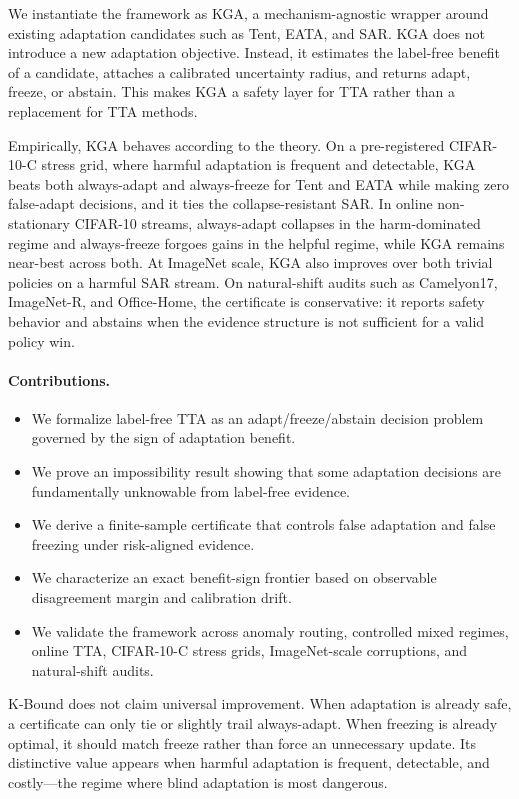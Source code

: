 \documentclass[11pt]{article}
\theoremstyle{plain}
\theoremstyle{definition}
\begin{document}
We instantiate the framework as \textsc{KGA}, a mechanism-agnostic wrapper around
existing adaptation candidates such as Tent, EATA, and SAR. \textsc{KGA} does not
introduce a new adaptation objective. Instead, it estimates the label-free benefit
of a candidate, attaches a calibrated uncertainty radius, and returns adapt,
freeze, or abstain. This makes \textsc{KGA} a safety layer for TTA rather than a
replacement for TTA methods.

Empirically, \textsc{KGA} behaves according to the theory. On a pre-registered
CIFAR-10-C stress grid, where harmful adaptation is frequent and detectable,
\textsc{KGA} beats both always-adapt and always-freeze for Tent and EATA while
making zero false-adapt decisions, and it ties the collapse-resistant SAR. In
online non-stationary CIFAR-10 streams, always-adapt collapses in the harm-dominated
regime and always-freeze forgoes gains in the helpful regime, while \textsc{KGA}
remains near-best across both. At ImageNet scale, \textsc{KGA} also improves over
both trivial policies on a harmful SAR stream. On natural-shift audits such as
Camelyon17, ImageNet-R, and Office-Home, the certificate is conservative: it
reports safety behavior and abstains when the evidence structure is not sufficient
for a valid policy win.

\paragraph{Contributions.}
\begin{itemize}
\item We formalize label-free TTA as an adapt/freeze/abstain decision problem governed by the sign of adaptation benefit.
\item We prove an impossibility result showing that some adaptation decisions are fundamentally unknowable from label-free evidence.
\item We derive a finite-sample certificate that controls false adaptation and false freezing under risk-aligned evidence.
\item We characterize an exact benefit-sign frontier based on observable disagreement margin and calibration drift.
\item We validate the framework across anomaly routing, controlled mixed regimes, online TTA, CIFAR-10-C stress grids, ImageNet-scale corruptions, and natural-shift audits.
\end{itemize}

K-Bound does not claim universal improvement. When adaptation is already safe, a
certificate can only tie or slightly trail always-adapt. When freezing is already
optimal, it should match freeze rather than force an unnecessary update. Its
distinctive value appears when harmful adaptation is frequent, detectable, and
costly---the regime where blind adaptation is most dangerous.
\end{document}
